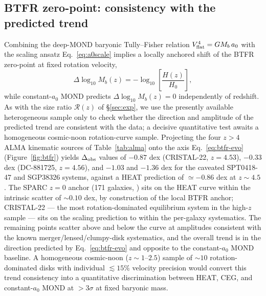 \documentclass[twocolumn,letterpaper]{aastex631}
\newcommand{\azero}{a_0}
\begin{document}
\subsection{BTFR zero-point: consistency with the predicted
  trend}\label{sec:btfr}

Combining the deep-MOND baryonic Tully--Fisher relation
$V_{\rm flat}^{4}=GM_{b}\,\azero$
\citep{Milgrom1983,FamaeyMcGaugh2012} with the
scaling ansatz Eq.~\ref{eq:a0scale} implies a locally anchored
shift of
the BTFR zero-point at fixed rotation velocity,
\begin{equation}
  \Delta\log_{10}M_{b}(z)=-\log_{10}\!\left[\frac{H(z)}{H_{0}}\right],
  \label{eq:btfr-evo}
\end{equation}
while constant-$\azero$ MOND predicts
$\Delta\log_{10}M_{b}(z)=0$ independently of redshift.  As with
the size ratio $\mathcal{R}(z)$ of \S\ref{sec:exp}, we use the
presently available heterogeneous sample only to check whether
the direction and amplitude of the predicted trend are
consistent with the data; a decisive quantitative test awaits a
homogeneous cosmic-noon rotation-curve sample.  Projecting the
four $z>4$ ALMA kinematic sources of Table~\ref{tab:alma} onto
the axis Eq.~\ref{eq:btfr-evo} (Figure~\ref{fig:btfr}) yields
$\Delta_{\rm obs}$ values of $-0.87$ dex (CRISTAL-22, $z=4.53$),
$-0.33$ dex (DC-881725, $z=4.56$), and $-1.03$ and $-1.36$ dex
for the caveated SPT0418-47 and SGP38326 systems, against a
HEAT prediction of $\simeq-0.86$ dex at $z\!\sim\!4.5$.  The SPARC
$z=0$ anchor (171 galaxies, \citealt{Lelli2016}) sits on the
HEAT curve within the \citet{Lelli2019} intrinsic scatter of
$\sim 0.10$ dex, by construction of the local BTFR anchor;
CRISTAL-22 --- the most rotation-dominated
equilibrium system in the high-$z$ sample --- sits on the
scaling prediction to within the per-galaxy
systematics.  The remaining points scatter above and below
the curve at amplitudes consistent with the known
merger/lensed/clumpy-disk systematics, and the overall trend
is in the direction predicted by Eq.~\ref{eq:btfr-evo} and
opposite to the constant-$\azero$ MOND baseline.  A homogeneous
cosmic-noon ($z\sim 1$--$2.5$) sample of $\sim 10$
rotation-dominated disks with individual $\lesssim 15\%$
velocity precision would convert this trend consistency into a
quantitative discrimination between HEAT, CEG, and
constant-$\azero$ MOND at $>3\sigma$ at fixed baryonic mass.
\end{document}
